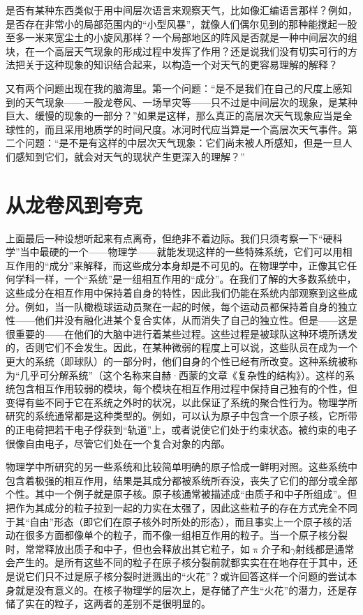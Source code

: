 是否有某种东西类似于用中间层次语言来观察天气，比如像汇编语言那样？例如，是否存在非常小的局部范围内的“小型风暴”，就像人们偶尔见到的那种能搅起一股至多一米来宽尘土的小旋风那样？一个局部地区的阵风是否就是一种中间层次的组块，在一个高层天气现象的形成过程中发挥了作用？还是说我们没有切实可行的方法把关于这种现象的知识结合起来，以构造一个对天气的更容易理解的解释？

又有两个问题出现在我的脑海里。第一个问题：“是不是我们在自己的尺度上感知到的天气现象——一股龙卷风、一场旱灾等——只不过是中间层次的现象，是某种巨大、缓慢的现象的一部分？”如果是这样，那么真正的高层次天气现象应当是全球性的，而且采用地质学的时间尺度。冰河时代应当算是一个高层次天气事件。第二个问题：“是不是有这样的中层次天气现象：它们尚未被人所感知，但是一旦人们感知到它们，就会对天气的现状产生更深入的理解？”

\section{从龙卷风到夸克}

上面最后一种设想听起来有点离奇，但绝非不着边际。我们只须考察一下“硬科学”当中最硬的一个——物理学——就能发现这样的一些特殊系统，它们可以用相互作用的“成分”来解释，而这些成分本身却是不可见的。在物理学中，正像其它任何学科一样，一个“系统”是一组相互作用的“成分”。在我们了解的大多数系统中，这些成分在相互作用中保持着自身的特性，因此我们仍能在系统内部观察到这些成分。例如，当一队橄榄球运动员聚在一起的时候，每个运动员都保持着自身的独立性——他们并没有融化进某个复合实体，从而消失了自己的独立性。但是——这是很重要的——在他们的大脑中进行着某些过程。这些过程是被球队这种环境所诱发的，否则它们不会发生。因此，在某种微弱的程度上可以说，这些队员在成为一个更大的系统（即球队）的一部分时，他们自身的个性已经有所改变。这种系统被称为“几乎可分解系统”（这个名称来自赫·西蒙的文章《复杂性的结构》）。这样的系统包含相互作用较弱的模块，每个模块在相互作用过程中保持自己独有的个性，但变得有些不同于它在系统之外时的状况，以此保证了系统的聚合性行为。物理学所研究的系统通常都是这种类型的。例如，可以认为原子中包含一个原子核，它所带的正电荷把若干电子俘获到“轨道”上，或者说使它们处于约束状态。被约束的电子很像自由电子，尽管它们处在一个复合对象的内部。

物理学中所研究的另一些系统和比较简单明确的原子恰成一鲜明对照。这些系统中包含着极强的相互作用，结果是其成分都被系统所吞没，丧失了它们的部分或全部个性。其中一个例子就是原子核。原子核通常被描述成“由质子和中子所组成”。但把作为其成分的粒子拉到一起的力实在太强了，因此这些粒子的存在方式完全不同于其“自由”形态（即它们在原子核外时所处的形态），而且事实上一个原子核的活动在很多方面都像单个的粒子，而不像一组相互作用的粒子。当一个原子核分裂时，常常释放出质子和中子，但也会释放出其它粒子，如$\uppi$介子和$\gamma$射线都是通常会产生的。是所有这些不同的粒子在原子核分裂前就都实实在在地存在于其中，还是说它们只不过是原子核分裂时迸溅出的“火花”？或许回答这样一个问题的尝试本身就是没有意义的。在核子物理学的层次上，是存储了产生“火花”的潜力，还是存储了实在的粒子，这两者的差别不是很明显的。

